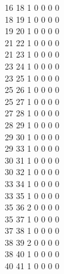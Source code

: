 \documentclass[11pt,titlepage,dvipdfmx,twoside]{article}
\begin{document}
\begin{oframed}
{ 16 18  1  0  0  0  0                                                      \\
 18 19  1  0  0  0  0                                                      \\
 19 20  1  0  0  0  0                                                      \\
 21 22  1  0  0  0  0                                                      \\
 21 23  1  0  0  0  0                                                      \\
 23 24  1  0  0  0  0                                                      \\
 23 25  1  0  0  0  0                                                      \\
 25 26  1  0  0  0  0                                                      \\
 25 27  1  0  0  0  0                                                      \\
 27 28  1  0  0  0  0                                                      \\
 28 29  1  0  0  0  0                                                      \\
 29 30  1  0  0  0  0                                                      \\
 29 33  1  0  0  0  0                                                      \\
 30 31  1  0  0  0  0                                                      \\
 30 32  1  0  0  0  0                                                      \\
 33 34  1  0  0  0  0                                                      \\
 33 35  1  0  0  0  0                                                      \\
 35 36  2  0  0  0  0                                                      \\
 35 37  1  0  0  0  0                                                      \\
 37 38  1  0  0  0  0                                                      \\
 38 39  2  0  0  0  0                                                      \\
 38 40  1  0  0  0  0                                                      \\
 40 41  1  0  0  0  0                                                      \\
}
\end{oframed}
\end{document}
